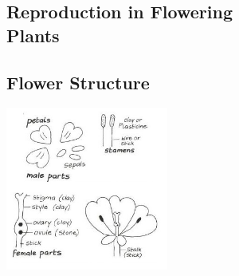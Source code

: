 \begin{multicols}{2}
%
%


\section*{Reproduction in Flowering \hfill \\  Plants}


\subsection{Flower Structure} %

\begin{center}
\includegraphics[width=0.4\textwidth]{./img/vso/flower-structure.jpg}
\end{center}


\end{multicols}

